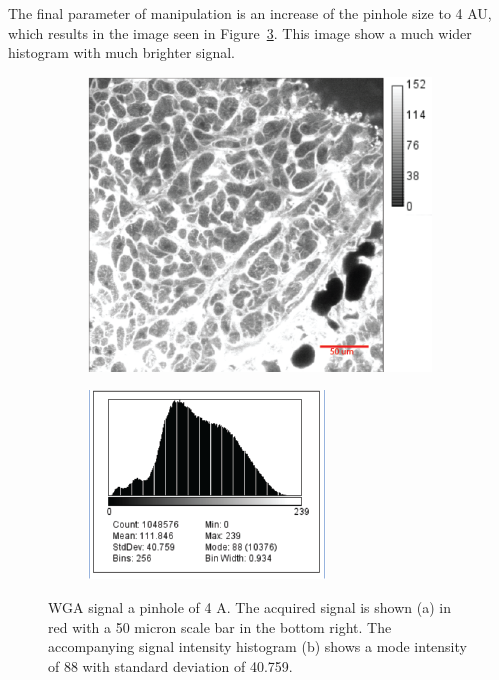 \documentclass[12pt]{article}
\begin{document}
The final parameter of manipulation is an increase of the pinhole size to 4 AU, which results in the image seen in Figure~\ref{fig:wga_pinhole}. This image show a much wider histogram with much brighter signal.

\begin{figure}[H]
	\begin{subfigure}{.5\textwidth}
		\centering
		\includegraphics[width=.95\linewidth]{FinalFigures/WGA_pinhole.png}
		\caption{}
		\label{fig:wga_pin}
	\end{subfigure}%
	\begin{subfigure}{.5\textwidth}
		\centering
		\includegraphics[width=.95\linewidth]{FinalFigures/WGA_Pinhole_Hist.png}
		\caption{}
		\label{fig:wga_pin_hist}
	\end{subfigure}
	\caption{WGA signal a pinhole of 4 A. The acquired signal is shown (a) in red with a 50 micron scale bar in the bottom right. The accompanying signal intensity histogram (b) shows a mode intensity of 88 with standard deviation of 40.759.}
	\label{fig:wga_pinhole}
\end{figure}
\end{document}

